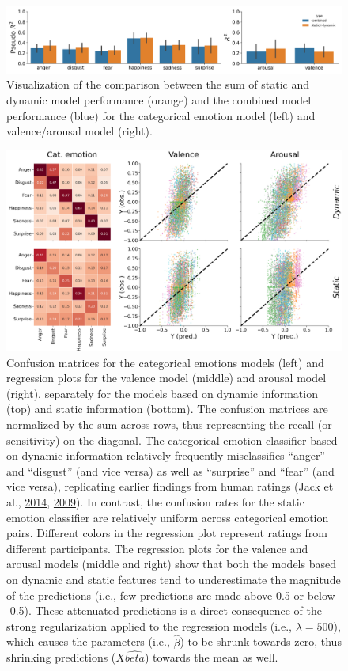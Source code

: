 \documentclass[11pt,american,a4paper,oneside,]{memoir} %
\begin{document}
\begin{figure}
\centering
\includegraphics{_bookdown_files/static-vs-dynamic-files/figures/figure_S4.pdf}
\caption{\label{fig:fig-svsd-S4}Visualization of the comparison between the sum of static and dynamic model performance (orange) and the combined model performance (blue) for the categorical emotion model (left) and valence/arousal model (right).}
\end{figure}



\begin{figure}
\centering
\includegraphics{_bookdown_files/static-vs-dynamic-files/figures/figure_S5.pdf}
\caption{\label{fig:fig-svsd-S5}Confusion matrices for the categorical emotions models (left) and regression plots for the valence model (middle) and arousal model (right), separately for the models based on dynamic information (top) and static information (bottom). The confusion matrices are normalized by the sum across rows, thus representing the recall (or sensitivity) on the diagonal. The categorical emotion classifier based on dynamic information relatively frequently misclassifies ``anger'' and ``disgust'' (and vice versa) as well as ``surprise'' and ``fear'' (and vice versa), replicating earlier findings from human ratings (Jack et al., \protect\hyperlink{ref-Jack2014-ku}{2014}, \protect\hyperlink{ref-Jack2009-yy}{2009}). In contrast, the confusion rates for the static emotion classifier are relatively uniform across categorical emotion pairs. Different colors in the regression plot represent ratings from different participants. The regression plots for the valence and arousal models (middle and right) show that both the models based on dynamic and static features tend to underestimate the magnitude of the predictions (i.e., few predictions are made above 0.5 or below -0.5). These attenuated predictions is a direct consequence of the strong regularization applied to the regression models (i.e., \(\lambda = 500\)), which causes the parameters (i.e., \(\hat{\beta}\)) to be shrunk towards zero, thus shrinking predictions (\(X\hat{beta}\)) towards the mean as well.}
\end{figure}
\end{document}
